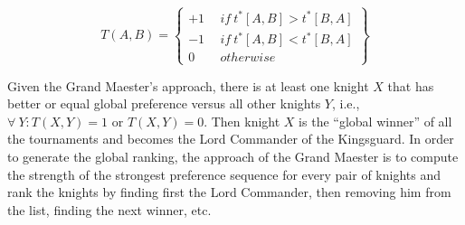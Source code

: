 \documentclass[11pt]{article}
\begin{document}
\begin{equation*}
T(A,B)=\left\{
\begin{matrix}+1\ &\ if\ t^*[A,B]>t^*[B,A]\\
-1\ &\ if\ t^*[A,B]<t^*[B,A]\\
0\ &\ otherwise
\end{matrix}
\right\}
\end{equation*}

\noindent Given the Grand Maester's approach, there is at least one
knight $X$ that has better or equal global preference versus all other
knights $Y$, i.e., $\forall\ Y: T(X,Y) = 1$ or $T(X,Y)=0$. Then knight
$X$ is the ``global winner'' of all the tournaments and becomes the
Lord Commander of the Kingsguard.  In order to generate the global
ranking, the approach of the Grand Maester is to compute the strength
of the strongest preference sequence for every pair of knights and
rank the knights by finding first the Lord Commander, then removing
him from the list, finding the next winner, etc.\\
\end{document}
